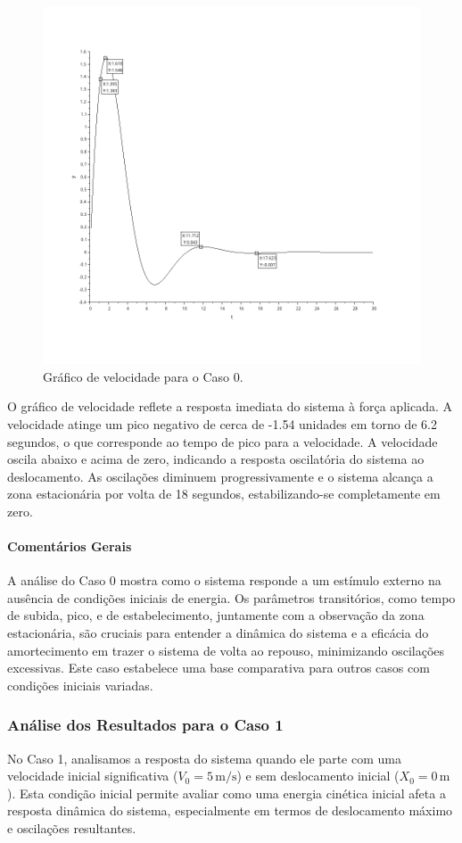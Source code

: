 \begin{figure}[H]
    \centering
    \includegraphics[height=0.7\textwidth]{final/2-atividade/assets/velocidade-caso-0.png}
    \caption{Gráfico de velocidade para o Caso 0.}
\end{figure}
O gráfico de velocidade reflete a resposta imediata do sistema à força aplicada. A velocidade atinge um pico negativo de cerca de -1.54 unidades em torno de 6.2 segundos, o que corresponde ao tempo de pico para a velocidade. A velocidade oscila abaixo e acima de zero, indicando a resposta oscilatória do sistema ao deslocamento. As oscilações diminuem progressivamente e o sistema alcança a zona estacionária por volta de 18 segundos, estabilizando-se completamente em zero.

\paragraph{Comentários Gerais}
A análise do Caso 0 mostra como o sistema responde a um estímulo externo na ausência de condições iniciais de energia. Os parâmetros transitórios, como tempo de subida, pico, e de estabelecimento, juntamente com a observação da zona estacionária, são cruciais para entender a dinâmica do sistema e a eficácia do amortecimento em trazer o sistema de volta ao repouso, minimizando oscilações excessivas. Este caso estabelece uma base comparativa para outros casos com condições iniciais variadas.


\subsubsection{Análise dos Resultados para o Caso 1}
No Caso 1, analisamos a resposta do sistema quando ele parte com uma velocidade inicial significativa (\(V_0 = 5 \, \text{m/s}\)) e sem deslocamento inicial (\(X_0 = 0 \, \text{m}\)). Esta condição inicial permite avaliar como uma energia cinética inicial afeta a resposta dinâmica do sistema, especialmente em termos de deslocamento máximo e oscilações resultantes.


